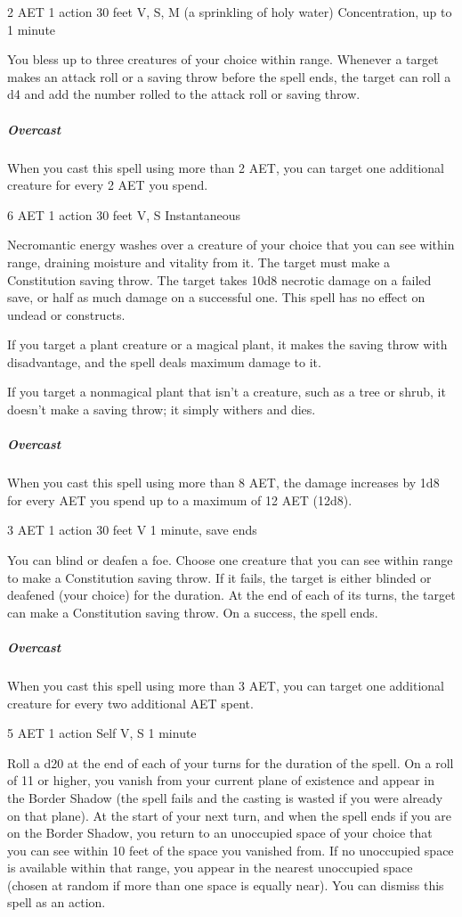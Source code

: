 {2 AET}
{1 action}
{30 feet}
{V, S, M (a sprinkling of holy water)}
{Concentration, up to 1 minute}

You bless up to three creatures of your choice within range. Whenever a target makes an attack roll or a saving throw before the spell ends, the target can roll a d4 and add the number rolled to the attack roll or saving throw.

\subparagraph*{Overcast} When you cast this spell using more than 2 AET, you can target one additional creature for every 2 AET you spend.


{6 AET}
{1 action}
{30 feet}
{V, S}
{Instantaneous}

Necromantic energy washes over a creature of your choice that you can see within range, draining moisture and vitality from it. The target must make a Constitution saving throw. The target takes 10d8 necrotic damage on a failed save, or half as much damage on a successful one. This spell has no effect on undead or constructs.

If you target a plant creature or a magical plant, it makes the saving throw with disadvantage, and the spell deals maximum damage to it.

If you target a nonmagical plant that isn't a creature, such as a tree or shrub, it doesn't make a saving throw; it simply withers and dies.

\subparagraph*{Overcast} When you cast this spell using more than 8 AET, the damage increases by 1d8 for every AET you spend up to a maximum of 12 AET (12d8).


{3 AET}
{1 action}
{30 feet}
{V}
{1 minute, save ends}

You can blind or deafen a foe. Choose one creature that you can see within range to make a Constitution saving throw. If it fails, the target is either blinded or deafened (your choice) for the duration. At the end of each of its turns, the target can make a Constitution saving throw. On a success, the spell ends.

\subparagraph*{Overcast} When you cast this spell using more than 3 AET, you can target one additional creature for every two additional AET spent.


{5 AET}
{1 action}
{Self}
{V, S}
{1 minute}

Roll a d20 at the end of each of your turns for the duration of the spell. On a roll of 11 or higher, you vanish from your current plane of existence and appear in the Border Shadow (the spell fails and the casting is wasted if you were already on that plane). At the start of your next turn, and when the spell ends if you are on the Border Shadow, you return to an unoccupied space of your choice that you can see within 10 feet of the space you vanished from. If no unoccupied space is available within that range, you appear in the nearest unoccupied space (chosen at random if more than one space is equally near). You can dismiss this spell as an action.

